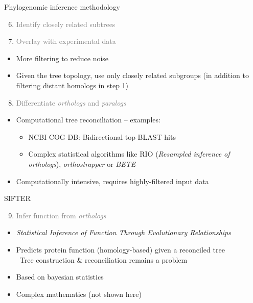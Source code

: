 \documentclass[14pt,xcolor=dvipsnames,pdftex]{beamer}
\begin{document}
\begin{frame}[allowframebreaks]{Phylogenomic inference methodology}
\begin{itemize}
 \end{itemize}
 \framebreak
 \begin{enumerate}
  \setcounter{enumi}{5}
  \item \textcolor{gray}{Identify closely related subtrees}
  \item \textcolor{gray}{Overlay with experimental data}
 \end{enumerate}
 \begin{itemize}
  \item More filtering to reduce noise
  \item Given the tree topology, use only closely related subgroups (in addition to filtering distant homologs in step 1)
 \end{itemize}
 \framebreak
 \begin{enumerate}
  \setcounter{enumi}{7}
  \item \textcolor{gray}{Differentiate \textit{orthologs} and \textit{paralogs}}
 \end{enumerate}
 \begin{itemize}
  \item Computational tree reconciliation -- examples:
  \begin{itemize}
  \item NCBI COG DB: Bidirectional top BLAST hits
  \item Complex statistical algorithms like RIO (\textit{Resampled inference of orthologs}), \textit{orthostrapper} or \textit{BETE}
  \end{itemize}
  \item Computationally intensive, requires highly-filtered input data
 \end{itemize}
\end{frame}

\begin{frame}{SIFTER}
 \begin{enumerate}
  \setcounter{enumi}{8}
  \item \textcolor{gray}{Infer function from \textit{orthologs}}
 \end{enumerate}
\begin{itemize}
 \item \textit{Statistical Inference of Function Through Evolutionary Relationships}
 \item Predicts protein function (homology-based) given a reconciled tree\\
 \textrightarrow\ Tree construction \& reconciliation remains a problem
 \item Based on bayesian statistics
 \item Complex mathematics (not shown here)
\end{itemize}
\end{frame}
\end{document}
